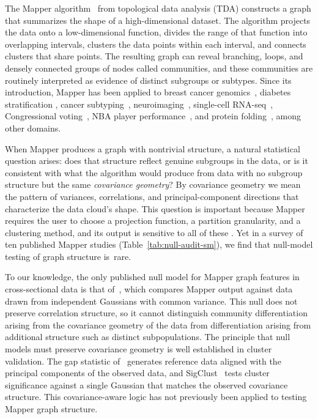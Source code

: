 \documentclass[hidelinks]{siamart251216}
\begin{document}
The Mapper algorithm~\citep{Singh2007} from topological data analysis
(TDA) constructs a graph that summarizes the shape of a
high-dimensional dataset.  The algorithm projects the data onto a
low-dimensional function, divides the range of that function into
overlapping intervals, clusters the data points within each interval,
and connects clusters that share points.  The resulting graph can reveal
branching, loops, and densely connected groups of nodes called
communities, and these communities are routinely interpreted as evidence
of distinct subgroups or subtypes.  Since its introduction, Mapper has been applied to breast cancer
genomics~\citep{Nicolau2011, Lum2013}, diabetes stratification
\citep{Li2015, Wamil2023}, cancer subtyping~\citep{Rafique2020},
neuroimaging~\citep{Saggar2018, Geniesse2022, Hasegan2024}, single-cell
RNA-seq~\citep{Rizvi2017}, Congressional voting~\citep{Lum2012}, NBA player
performance~\citep{Lum2013}, and protein folding~\citep{Yao2009}, among
other domains.

When Mapper produces a graph with nontrivial structure, a natural
statistical question arises: does that structure reflect genuine
subgroups in the data, or is it consistent with what the algorithm would
produce from data with no subgroup structure but the same
\emph{covariance geometry}?  By covariance geometry we mean the pattern of variances, correlations, and
principal-component directions that characterize the data cloud's shape.
This question is important because Mapper requires the user to choose a
projection function, a partition granularity, and a clustering method,
and its output is sensitive to all of these
\citep{Dey2016, Alvarado2024, VejdemoJohansson2025}.  Yet in a survey of ten published Mapper studies
(Table~\ref{tab:null-audit-sm}), we find that null-model testing of graph structure is~rare.

To our knowledge, the only published null model for Mapper graph
features in cross-sectional data is that of~\cite{Lum2013}, which
compares Mapper output against data drawn from independent Gaussians
with common variance.  This null does not preserve correlation
structure, so it cannot distinguish community differentiation arising
from the covariance geometry of the data from differentiation arising
from additional structure such as distinct subpopulations.  The principle that null
models must preserve covariance geometry is well established in cluster
validation.  The gap statistic of~\cite{Tibshirani2001} generates
reference data aligned with the principal components of the observed
data, and SigClust~\citep{Liu2008} tests cluster significance against a
single Gaussian that matches the observed covariance structure.  This covariance-aware logic has not previously been applied to testing
Mapper graph structure.
\end{document}
